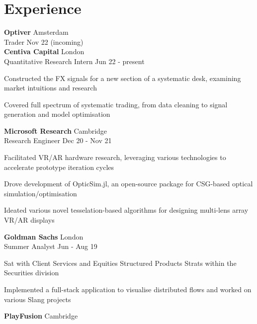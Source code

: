 \documentclass[letterpaper, 10pt]{article}
\begin{document}
\section*{Experience}
\textbf{Optiver} \hfill Amsterdam\\
Trader \hfill Nov 22 (incoming)\vspace{.5\baselineskip}\\
\textbf{Centiva Capital} \hfill London\\
Quantitative Research Intern \hfill Jun 22 - present
\begin{compact}
	\item Constructed the FX signals for a new section of a systematic desk, examining market intuitions and research
	\item Covered full spectrum of systematic trading, from data cleaning to signal generation and model optimisation
\end{compact}
\vspace{.5\baselineskip}
\textbf{Microsoft Research} \hfill Cambridge\\
Research Engineer \hfill Dec 20 - Nov 21
\begin{compact}
	\item Facilitated VR/AR hardware research, leveraging various technologies to accelerate prototype iteration cycles
	\item Drove development of OpticSim.jl, an open-source package for CSG-based optical simulation/optimisation
	\item Ideated various novel tesselation-based algorithms for designing multi-lens array VR/AR displays
\end{compact}
\vspace{.5\baselineskip}
\textbf{Goldman Sachs} \hfill London\\
Summer Analyst \hfill Jun - Aug 19
\begin{compact}
	\item Sat with Client Services and Equities Structured Products Strats within the Securities division
	\item Implemented a full-stack application to visualise distributed flows and worked on various Slang projects
\end{compact}
\vspace{.5\baselineskip}
\textbf{PlayFusion} \hfill Cambridge\\
\end{document}
